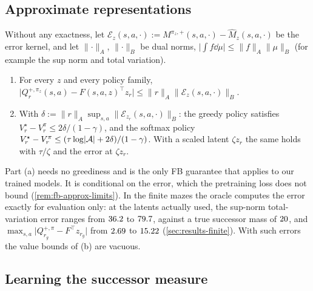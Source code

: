 \subsection{Approximate representations}

\begin{theorem}\label{thm:m-fb-approx}
Without any exactness, let $\mathcal E_z(s,a,\cdot):=M^{\pi_z,+}(s,a,\cdot)-\hat M_z(s,a,\cdot)$ be the error kernel, and let $\lVert\cdot\rVert_A$, $\lVert\cdot\rVert_B$ be dual norms, $\lvert\int f\dd\mu\rvert\le\lVert f\rVert_A\lVert\mu\rVert_B$ (for example the sup norm and total variation).
\begin{enumerate}[nosep,label=(\alph*)]
\item For every $z$ and every policy family, $\lvert Q^{+,\pi_z}_r(s,a)-F(s,a,z)^\top z_r\rvert\le\lVert r\rVert_A\lVert\mathcal E_z(s,a,\cdot)\rVert_B$.
\item With $\delta:=\lVert r\rVert_A\sup_{s,a}\lVert\mathcal E_{z_r}(s,a,\cdot)\rVert_B$: the greedy policy satisfies $V^\star_r-V^{\pi}_r\le2\delta/(1-\gamma)$, and the softmax policy $V^\star_r-V^\pi_r\le(\tau\log\lvert\cA\rvert+2\delta)/(1-\gamma)$. With a scaled latent $\zeta z_r$ the same holds with $\tau/\zeta$ and the error at $\zeta z_r$.
\end{enumerate}
\end{theorem}

Part (a) needs no greediness and is the only FB guarantee that applies to our trained models. It is conditional on the error, which the pretraining loss does not bound (\cref{rem:fb-approx-limits}).
In the finite mazes the oracle computes the error exactly for evaluation only: at the latents actually used, the sup-norm total-variation error ranges from $\vn{s06.tv.lo}{36.2}$ to $\vn{s06.tv.hi}{79.7}$, against a true successor mass of $\vn{const.mass}{20}$, and $\max_{s,a}\lvert Q^{+,\pi}_{r_g}-F^\top z_{r_g}\rvert$ from $\vn{s06.q.lo}{2.69}$ to $\vn{s06.q.hi}{15.22}$ (\cref{sec:results-finite}). With such errors the value bounds of (b) are vacuous.

\subsection{Learning the successor measure}\label{sec:m-fb-loss}

